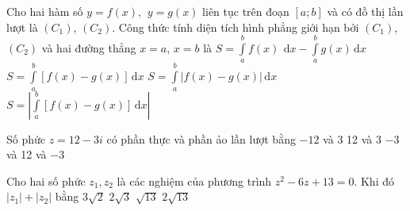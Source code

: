 \begin{ex}%
	Cho hai hàm số $y=f(x),\,\ y=g(x)$ liên tục trên đoạn $[a;b]$ và có đồ thị lần lượt là $\left(C_1\right)$,  $\left(C_2\right)$. Công thức tính diện tích hình phẳng giới hạn bởi $\left(C_1\right)$, $\left(C_2\right)$ và hai đường thẳng $x=a$, $x=b$ là
	\choice
	{$S=\displaystyle\int\limits_a^b f(x)\ \mathrm{\,d}x-\displaystyle\int\limits_a^b g(x)\mathrm{\,d}x$}
	{$S=\displaystyle\int\limits_a^b \left[f(x)-g(x) \right]\mathrm{\,d}x$}
	{\True $S=\displaystyle\int\limits_a^b \left|f(x)-g(x)\right|\mathrm{\,d}x$}
	{$S=\left|\displaystyle\int\limits_a^b \left[f(x)-g(x)\right]\mathrm{\,d}x \right|$}
\end{ex}
\begin{ex}%
	Số phức $z=12-3i$ có phần thực và phần ảo lần lượt bằng
	\choice
	{$-12$ và 3}
	{12 và 3}
	{$-3$ và 12}
	{ và $-3$}
\end{ex}
\begin{ex}%
	Cho hai số phức $z_1,z_2$ là các nghiệm của phương trình $z^2-6z+13=0$. Khi đó $\left|z_1\right|+\left|z_2\right|$ bằng
	\choice
	{$3\sqrt{2}$}
	{$2\sqrt{3}$}
	{$\sqrt{13}$}
	{\True $2\sqrt{13}$}
	\loigiai{
	Ta có $z^2-6z+13=0 \Leftrightarrow \left[\begin{aligned}
		&z_1=3+2i \\
		&z_2=3-2i
		\end{aligned}\right. $. \\
		$\left|z_1\right|+\left|z_2\right|=2\sqrt{13}$.}
\end{ex}
